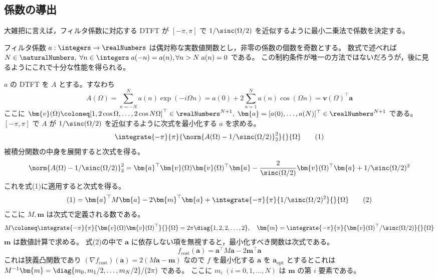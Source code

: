         \subsection{係数の導出}
            大雑把に言えば，フィルタ係数に対応する DTFT が $[-\pi,\pi]$ で $1/\sinc(\Omega/2)$ を近似するように最小二乗法で係数を決定する。
            \par
            フィルタ係数 $a:\integers\to\realNumbers$ は偶対称な実数値関数とし，非零の係数の個数を奇数とする。
            数式で述べれば $N\in\naturalNumbers,\;\forall n\in\integers\;a(-n) = a(n),\forall n>N\;a(n) = 0$ である。
            この制約条件が唯一の方法ではないだろうが，後に見るようにこれで十分な性能を得られる。
            \par
            $a$ の DTFT を $A$ とする。すなわち
            \[ A(\Omega) = \sum_{n=-N}^N a(n)\exp(-i\Omega n) = a(0) + 2\sum_{n=1}^N a(n)\cos(\Omega n) = \bm{v}(\Omega)^\top\bm{a} \]
            ここに $\bm{v}(\Omega) \coloneq [1, 2\cos\Omega,\dots,2\cos N\Omega]^\top\in\realNumbers^{N+1},\;\bm{a} = [a(0),\dots,a(N)]^\top\in\realNumbers^{N+1}$ である。
            $[-\pi,\pi]$ で $A$ が $1/\sinc(\Omega/2)$ を近似するように次式を最小化する $a$ を求める。
            \[ \integrate{-\pi}{\pi}{\norm{A(\Omega) - 1/\sinc(\Omega/2)}_2^2}{}{\Omega} \tag{1} \]
            被積分関数の中身を展開すると次式を得る。
            \[ \norm{A(\Omega) - 1/\sinc(\Omega/2)}_2^2 = \bm{a}^\top\bm{v}(\Omega)\bm{v}(\Omega)^\top\bm{a} - \frac{2}{\sinc(\Omega/2)}\bm{v}(\Omega)^\top\bm{a} + 1/\sinc(\Omega/2)^2 \]
            これを式(1)に適用すると次式を得る。
            \[ (1) = \bm{a}^\top M\bm{a} - 2\bm{m}^\top\bm{a} + \integrate{-\pi}{\pi}{1/\sinc(\Omega/2)^2}{}{\Omega} \tag{2} \]
            ここに $M,\bm{m}$ は次式で定義される数である。
            \[ M \coloneq \integrate{-\pi}{\pi}{\bm{v}(\Omega)\bm{v}(\Omega)^\top}{}{\Omega} = 2\pi\diag{1,2,2,\dots,2},\quad \bm{m} = \integrate{-\pi}{\pi}{\bm{v}(\Omega)^\top/\sinc(\Omega/2)}{}{\Omega} \]
            $\bm{m}$ は数値計算で求める。
            式(2)の中で $\bm{a}$ に依存しない項を無視すると，最小化すべき関数は次式である。
            \[ f_\text{cost}(\bm{a}) = \bm{a}^\top M\bm{a} - 2\bm{m}^\top\bm{a} \]
            これは狭義凸関数であり $(\nabla f_\text{cost})(\bm{a}) = 2(M\bm{a} - \bm{m})$ なので $f$ を最小化する $\bm{a}$ を $\bm{a}_\text{opt}$ とするとこれは $M^{-1}\bm{m} = \diag{m_0,m_1 /2,\dots,m_N /2}/(2\pi)$ である。
            ここに $m_i\;(i=0,1,\dots,N)$ は $\bm{m}$ の第 $i$ 要素である。

